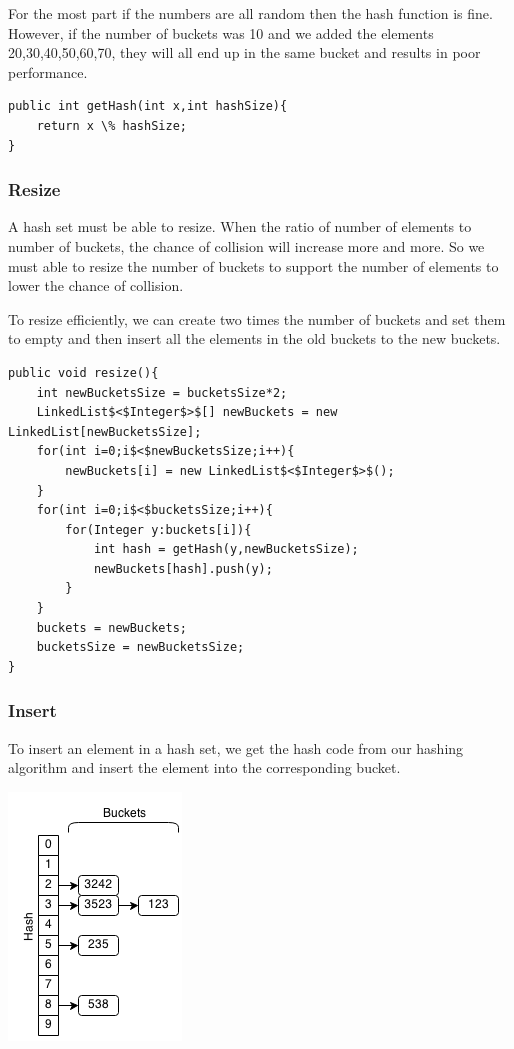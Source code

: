 \documentclass[11pt,oneside]{book}
\makeatletter
\def\maxwidth#1{\ifdim\Gin@nat@width>#1 #1\else\Gin@nat@width\fi}
\makeatother
\begin{document}
For the most part if the numbers are all random then the hash function is fine. However, if the number of buckets was 10 and we added the elements 20,30,40,50,60,70, they will all end up in the same bucket and results in poor performance.

\begin{lstlisting}
public int getHash(int x,int hashSize){
    return x \% hashSize;
}
\end{lstlisting}

\subsubsection{Resize}

A hash set must be able to resize. When the ratio of number of elements to number of buckets, the chance of collision will increase more and more. So we must able to resize the number of buckets to support the number of elements to lower the chance of collision.

To resize efficiently, we can create two times the number of buckets and set them to empty and then insert all the elements in the old buckets to the new buckets.

\begin{lstlisting}
public void resize(){
    int newBucketsSize = bucketsSize*2;
    LinkedList$<$Integer$>$[] newBuckets = new LinkedList[newBucketsSize];
    for(int i=0;i$<$newBucketsSize;i++){
        newBuckets[i] = new LinkedList$<$Integer$>$();
    }
    for(int i=0;i$<$bucketsSize;i++){
        for(Integer y:buckets[i]){
            int hash = getHash(y,newBucketsSize);
            newBuckets[hash].push(y);
        }
    }
    buckets = newBuckets;
    bucketsSize = newBucketsSize;
}
\end{lstlisting}

\subsubsection{Insert}

To insert an element in a hash set, we get the hash code from our hashing algorithm and insert the element into the corresponding bucket.

\includegraphics[width=\maxwidth{\textwidth}]{hashset.png}
\end{document}
